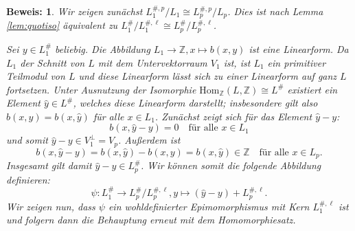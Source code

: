 \documentclass[12pt,a4paper,halfparskip,headsepline,bibtotocnumbered]{scrreprt}
\theoremstyle{nummermitklammern}
\theoremstyle{nonumberbreak}
\newtheorem{beweis}{Beweis:}
\newcommand{\Z}{\mathbb{Z}}
\begin{document}
\begin{beweis}
	Wir zeigen zunächst $L_1^{\#,p} / L_1  \cong L_p^{\#,p} / L_p$. Dies ist nach Lemma \eqref{lem:quotiso} äquivalent zu $L_1^\# / L_1^{\#,\ell} \cong L_p^\# / L_p^{\#, \ell}$.\par
	Sei $y \in L_1^\#$ beliebig. Die Abbildung $L_1 \rightarrow \Z, x \mapsto b(x,y)$ ist eine Linearform. Da $L_1$ der Schnitt von $L$ mit dem Untervektorraum $V_1$ ist, ist $L_1$ ein primitiver Teilmodul von $L$ und diese Linearform lässt sich zu einer Linearform auf ganz $L$ fortsetzen. Unter Ausnutzung der Isomorphie $\text{Hom}_\Z(L, \Z) \cong L^\#$ existiert ein Element $\hat{y} \in L^\#$, welches diese Linearform darstellt; insbesondere gilt also $b(x,y) = b(x, \hat{y})$ für alle $x \in L_1$. Zunächst zeigt sich für das Element $\hat{y} - y$:
	\begin{equation*}
		b(x, \hat{y} - y) = 0 \quad \text{für alle } x \in L_1
	\end{equation*}
	und somit $\hat{y} - y \in V_1^\perp = V_p$. Außerdem ist
	\begin{equation*}
		b(x, \hat{y} - y) = b(x, \hat{y}) - b(x,y) = b(x, \hat{y}) \in \Z \quad \text{für alle } x \in L_p.
	\end{equation*}
	Insgesamt gilt damit $\hat{y} - y \in L_p^\#$. Wir können somit die folgende Abbildung definieren:
	\begin{equation*}
		\psi: L_1^\# \rightarrow L_p^\# / L_p^{\#, \ell}, y \mapsto (\hat{y} - y) + L_p^{\#, \ell}.
	\end{equation*}
	Wir zeigen nun, dass $\psi$ ein wohldefinierter Epimomorphismus mit Kern $L_1^{\#, \ell}$ ist und folgern dann die Behauptung erneut mit dem Homomorphiesatz.
	

\end{beweis}
\end{document}
